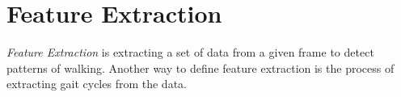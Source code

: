 \documentclass{sig-alternate}
\begin{document}
\section{Feature Extraction}
	\textit{Feature Extraction} is extracting a set of data from a given frame to detect patterns of walking. Another way to define feature extraction is the process of extracting gait cycles from the data. 		%
\end{document}
